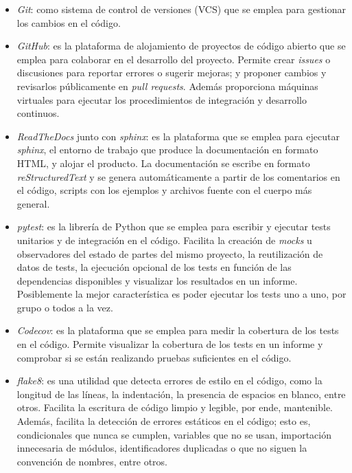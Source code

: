 \begin{itemize}
    \item \textit{Git}: como sistema de control de versiones (\gls{VCS}) que se emplea para gestionar los cambios en el código.
    \item \textit{GitHub}: es la plataforma de alojamiento de proyectos de código abierto que se emplea para colaborar en el desarrollo del proyecto. Permite crear \textit{issues} o discusiones para reportar errores o sugerir mejoras; y proponer cambios y revisarlos públicamente en \textit{pull requests}. Además proporciona máquinas virtuales para ejecutar los procedimientos de integración y desarrollo continuos.
    \item \textit{ReadTheDocs} junto con \textit{sphinx}: es la plataforma que se emplea para ejecutar \textit{sphinx}, el entorno de trabajo que produce la documentación en formato \gls{HTML}, y alojar el producto. La documentación se escribe en formato \textit{\gls{reStructuredText}} y se genera automáticamente a partir de los comentarios en el código, \gls{scripts} con los ejemplos y archivos fuente con el cuerpo más general.
    \item \textit{pytest}: es la librería de \gls{Python} que se emplea para escribir y ejecutar tests unitarios y de integración en el código. Facilita la creación de \textit{\gls{mocks}} u observadores del estado de partes del mismo proyecto, la reutilización de datos de tests, la ejecución opcional de los tests en función de las dependencias disponibles y visualizar los resultados en un informe. Posiblemente la mejor característica es poder ejecutar los tests uno a uno, por grupo o todos a la vez.
    \item \textit{Codecov}: es la plataforma que se emplea para medir la cobertura de los tests en el código. Permite visualizar la cobertura de los tests en un informe y comprobar si se están realizando pruebas suficientes en el código.
    \item \textit{flake8}: es una utilidad que detecta errores de estilo en el código, como la longitud de las líneas, la \gls{indentación}, la presencia de espacios en blanco, entre otros. Facilita la escritura de código limpio y legible, por ende, mantenible.
          Además, facilita la detección de errores estáticos en el código; esto es, condicionales que nunca se cumplen, variables que no se usan, importación innecesaria de módulos, identificadores duplicadas o que no siguen la convención de nombres, entre otros.

\end{itemize}

